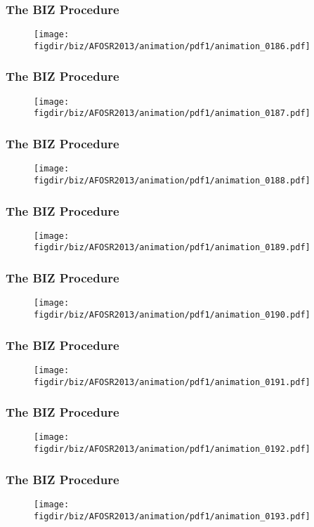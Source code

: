 \documentclass[13pt]{beamer}
\newcommand{\figdir}{../../fig}
\begin{document}
{\begin{frame}\frametitle{The BIZ Procedure}\begin{figure}\texttt{[image: \\figdir/biz/AFOSR2013/animation/pdf1/animation\_0186.pdf]}\end{figure}\end{frame}
\begin{frame}\frametitle{The BIZ Procedure}\begin{figure}\texttt{[image: \\figdir/biz/AFOSR2013/animation/pdf1/animation\_0187.pdf]}\end{figure}\end{frame}
\begin{frame}\frametitle{The BIZ Procedure}\begin{figure}\texttt{[image: \\figdir/biz/AFOSR2013/animation/pdf1/animation\_0188.pdf]}\end{figure}\end{frame}
\begin{frame}\frametitle{The BIZ Procedure}\begin{figure}\texttt{[image: \\figdir/biz/AFOSR2013/animation/pdf1/animation\_0189.pdf]}\end{figure}\end{frame}
\begin{frame}\frametitle{The BIZ Procedure}\begin{figure}\texttt{[image: \\figdir/biz/AFOSR2013/animation/pdf1/animation\_0190.pdf]}\end{figure}\end{frame}
\begin{frame}\frametitle{The BIZ Procedure}\begin{figure}\texttt{[image: \\figdir/biz/AFOSR2013/animation/pdf1/animation\_0191.pdf]}\end{figure}\end{frame}
\begin{frame}\frametitle{The BIZ Procedure}\begin{figure}\texttt{[image: \\figdir/biz/AFOSR2013/animation/pdf1/animation\_0192.pdf]}\end{figure}\end{frame}
\begin{frame}\frametitle{The BIZ Procedure}\begin{figure}\texttt{[image: \\figdir/biz/AFOSR2013/animation/pdf1/animation\_0193.pdf]}\end{figure}\end{frame}
}
\end{document}

